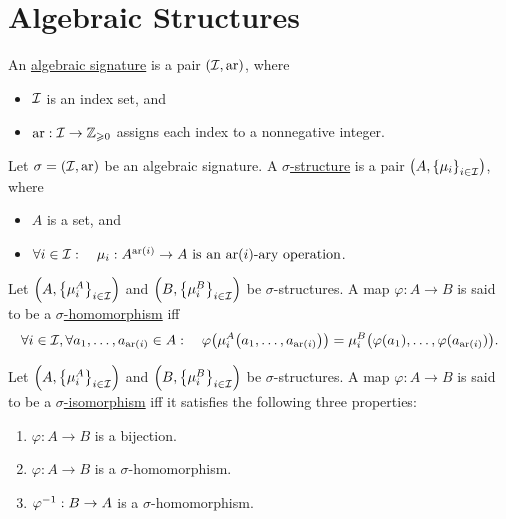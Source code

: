 \documentclass[11pt,reqno]{amsart}
\DeclareMathOperator{\ar}{ar}
\renewcommand{\phi}{\varphi}
\begin{document}
\section{Algebraic Structures}
\begin{Def}
An \ul{algebraic signature} is a pair $(\I,\ar)$, where
\begin{itemize}
\item $\mathcal{I}$ is an index set, and
\item $\ar:\I\to\Z_{\ge0}$ assigns each index to a nonnegative integer.
\end{itemize}
\end{Def}

\begin{Def}
Let $\sigma=(\I,\ar)$ be an algebraic signature.
A \ul{$\sigma$-structure} is a pair
$\Br{A,\set{\mu_i}_{i\in\I}}$, where
\begin{itemize}
\item $A$ is a set, and
\item
$\forall i\in\I:\quad
\mu_i:A^{\ar(i)}\to A
~\text{is an $\ar(i)$-ary operation}$.
\end{itemize}
\end{Def}

\begin{Def}
Let $\Br{A,\set{\mu_i^A}_{i\in\I}}$ and $\Br{B,\set{\mu_i^B}_{i\in\I}}$
be $\sigma$-structures.
A map $\phi:A\to B$ is said to be a \ul{$\sigma$-homomorphism} iff
\[
\forall i\in\I,\forall a_1,\dots,a_{\ar(i)}\in A:\quad
\phi\Br{\mu_i^A\Br{a_1,\dots,a_{\ar(i)}}}
=\mu_i^B\Br{\phi(a_1),\dots,\phi(a_{\ar(i)})}.
\]
\end{Def}

\begin{Def}
Let $\Br{A,\set{\mu_i^A}_{i\in\I}}$ and $\Br{B,\set{\mu_i^B}_{i\in\I}}$
be $\sigma$-structures.
A map $\phi:A\to B$ is said to be a \ul{$\sigma$-isomorphism} iff
it satisfies the following three properties:
\begin{enumerate}
\item $\phi:A\to B$ is a bijection.
\item $\phi:A\to B$ is a $\sigma$-homomorphism.
\item $\phi\inv:B\to A$ is a $\sigma$-homomorphism.
\end{enumerate}
\end{Def}
\end{document}

